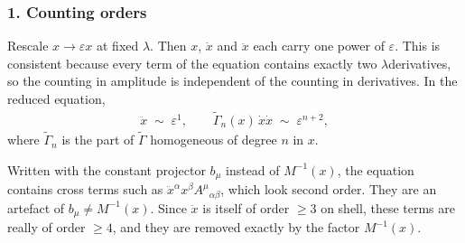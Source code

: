 \documentclass[letterpaper,10pt,english]{jupyterBook}
\begin{document}
\subsubsection{1. Counting orders}
\label{\detokenize{ch/relativity-general/geodesics-linearization:counting-orders}}
\sphinxAtStartPar
Rescale \(x\to\varepsilon x\) at fixed \(\lambda\). Then \(x\), \(\dot x\) and \(\ddot x\) each carry one power of \(\varepsilon\). This is consistent because every term of the equation contains exactly two \(\lambda\)\sphinxhyphen{}derivatives, so the counting in amplitude is independent of the counting in derivatives. In the reduced equation,
\begin{equation*}
\begin{split}
\ddot x\;\sim\;\varepsilon^1,\qquad \tilde\Gamma_n(x)\,\dot x\dot x\;\sim\;\varepsilon^{n+2},
\end{split}
\end{equation*}
\sphinxAtStartPar
where \(\tilde\Gamma_n\) is the part of \(\tilde\Gamma\) homogeneous of degree \(n\) in \(x\).

\sphinxAtStartPar
Written with the constant projector \(b_\mu\) instead of \(M^{-1}(x)\), the equation contains cross terms such as \(\ddot x^\alpha x^\beta A^\mu{}_{\alpha\beta}\), which look second order. They are an artefact of \(b_\mu\neq M^{-1}(x)\). Since \(\ddot x\) is itself of order \(\ge3\) on shell, these terms are really of order \(\ge4\), and they are removed exactly by the factor \(M^{-1}(x)\).
\end{document}
